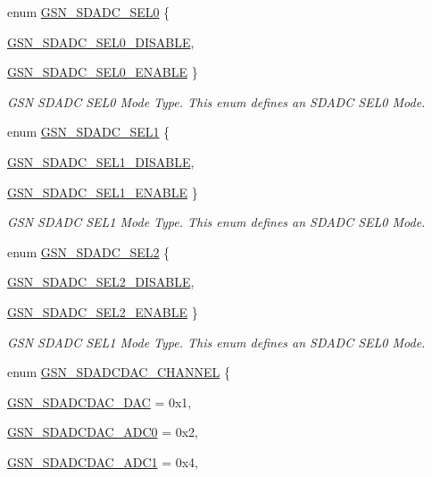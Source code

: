 \begin{DoxyCompactItemize}
enum \hyperlink{a00652_ga033785abce307d457533dfa53b59d84b}{GSN\_\-SDADC\_\-SEL0} \{ \par
\hyperlink{a00652_gga033785abce307d457533dfa53b59d84ba006fec0175e4c4c1bbcde3cd74bb0161}{GSN\_\-SDADC\_\-SEL0\_\-DISABLE}, 
\par
\hyperlink{a00652_gga033785abce307d457533dfa53b59d84bac95845a9bd57c4289957cb48b8c28373}{GSN\_\-SDADC\_\-SEL0\_\-ENABLE}
 \}
\begin{DoxyCompactList}\small\item\em GSN SDADC SEL0 Mode Type. This enum defines an SDADC SEL0 Mode. \end{DoxyCompactList}\item 
enum \hyperlink{a00652_ga7881f6f750388de2816384904fafac2a}{GSN\_\-SDADC\_\-SEL1} \{ \par
\hyperlink{a00652_gga7881f6f750388de2816384904fafac2aad040e5a10609b72d15f3f4ced9e108e1}{GSN\_\-SDADC\_\-SEL1\_\-DISABLE}, 
\par
\hyperlink{a00652_gga7881f6f750388de2816384904fafac2aa565a0e3706cba84eecf3e5beab847e22}{GSN\_\-SDADC\_\-SEL1\_\-ENABLE}
 \}
\begin{DoxyCompactList}\small\item\em GSN SDADC SEL1 Mode Type. This enum defines an SDADC SEL0 Mode. \end{DoxyCompactList}\item 
enum \hyperlink{a00652_gad596a4cc54081bcce130d18d07fd701a}{GSN\_\-SDADC\_\-SEL2} \{ \par
\hyperlink{a00652_ggad596a4cc54081bcce130d18d07fd701aa441f0c848f12eda7c5bc0d04f5a831c2}{GSN\_\-SDADC\_\-SEL2\_\-DISABLE}, 
\par
\hyperlink{a00652_ggad596a4cc54081bcce130d18d07fd701aa0e791e446dbe8195d30bca0683096adf}{GSN\_\-SDADC\_\-SEL2\_\-ENABLE}
 \}
\begin{DoxyCompactList}\small\item\em GSN SDADC SEL1 Mode Type. This enum defines an SDADC SEL0 Mode. \end{DoxyCompactList}\item 
enum \hyperlink{a00583_a56192ea32005a1a454642c75568557aa}{GSN\_\-SDADCDAC\_\-CHANNEL} \{ \par
\hyperlink{a00583_a56192ea32005a1a454642c75568557aaa8fd9ce2c79e58a88e1970f948b60f1db}{GSN\_\-SDADCDAC\_\-DAC} =  0x1, 
\par
\hyperlink{a00583_a56192ea32005a1a454642c75568557aaa23ba9856e22604bf925928259e03a968}{GSN\_\-SDADCDAC\_\-ADC0} =  0x2, 
\par
\hyperlink{a00583_a56192ea32005a1a454642c75568557aaaf2dbff914db5dc71e9c2b1f6b1355e94}{GSN\_\-SDADCDAC\_\-ADC1} =  0x4, 

\end{DoxyCompactItemize}
